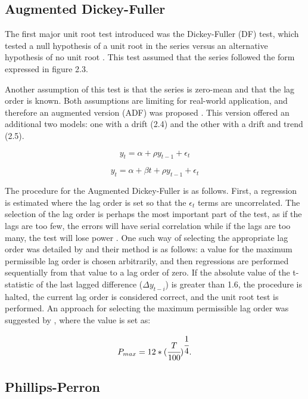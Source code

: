 \subsection{Augmented Dickey-Fuller}

The first major unit root test introduced was the Dickey-Fuller (DF) test, which tested a null hypothesis of a unit root in the series versus an alternative hypothesis of no unit root \citep{df}. This test assumed that the series followed the form expressed in figure 2.3.

Another assumption of this test is that the series is zero-mean and that the lag order is known. Both assumptions are limiting for real-world application, and therefore an augmented version (ADF) was proposed \citep{said1984testing}. This version offered an additional two models: one with a drift (2.4) and the other with a drift and trend (2.5).

\begin{equation}
y_t = \alpha + \rho y_{t-1} + \epsilon_t
\end{equation}

\begin{equation}
y_t = \alpha + \beta t + \rho y_{t-1} + \epsilon_t
\end{equation}

The procedure for the Augmented Dickey-Fuller is as follows. First, a regression is estimated where the lag order is set so that the $\epsilon_t$ terms are uncorrelated. The selection of the lag order is perhaps the most important part of the test, as if the lags are too few, the errors will have serial correlation while if the lags are too many, the test will lose power \citep{hlouskova}. One such way of selecting the appropriate lag order was detailed by \citet{ng1995unit} and their method is as follows: a value for the maximum permissible lag order is chosen arbitrarily, and then regressions are performed sequentially from that value to a lag order of zero. If the absolute value of the t-statistic of the last lagged difference ($\Delta y_{t-i}$) is greater than 1.6, the procedure is halted, the current lag order is considered correct, and the unit root test is performed. An approach for selecting the maximum permissible lag order was suggested by \citet{schwert}, where the value is set as:

\begin{equation}
P_{max} = 12 * (\cfrac{T}{100})^{\cfrac{1}{4}}.
\end{equation}


\subsection{Phillips-Perron}

